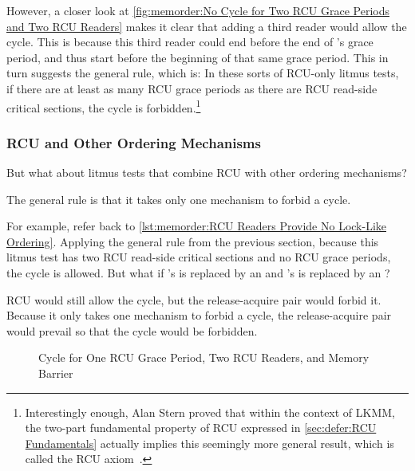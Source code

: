 However, a closer look at
\cref{fig:memorder:No Cycle for Two RCU Grace Periods and Two RCU Readers}
makes it clear that adding a third reader would allow the cycle.
This is because this third reader could end before the end of 's
grace period, and thus start before the beginning of that same grace
period.
This in turn suggests the general rule, which is:
In these sorts of RCU-only litmus tests, if there are at least as many
RCU grace periods as there are RCU read-side critical sections,
the cycle is forbidden.\footnote{
	Interestingly enough, Alan Stern proved that within the context
	of LKMM, the two-part fundamental property of RCU expressed
	in \cref{sec:defer:RCU Fundamentals} actually implies
	this seemingly more general result, which is called the RCU
	axiom~\cite{Alglave:2018:FSC:3173162.3177156}.}

\subsubsection{RCU and Other Ordering Mechanisms}
\label{sec:memorder:RCU and Other Ordering Mechanisms}

But what about litmus tests that combine RCU with other ordering
mechanisms?

The general rule is that it takes only one mechanism to forbid a cycle.

For example, refer back to
\cref{lst:memorder:RCU Readers Provide No Lock-Like Ordering}.
Applying the general rule from the previous section, because this litmus
test has two RCU read-side critical sections and no RCU grace periods,
the cycle is allowed.
But what if 's  is replaced by an
 and 's  is replaced
by an ?

RCU would still allow the cycle, but the release-acquire pair would
forbid it.
Because it only takes one mechanism to forbid a cycle, the
release-acquire pair would prevail so that the cycle would be
forbidden.

\begin{figure}
\centering
{}
\caption{Cycle for One RCU Grace Period, Two RCU Readers, and Memory Barrier}
\label{fig:memorder:Cycle for One RCU Grace Period; Two RCU Readers; and Memory Barrier}
\end{figure}

